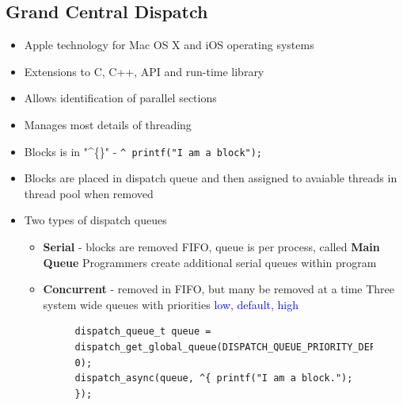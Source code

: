 \documentclass[oneside]{book}
\begin{document}
            \subsection{Grand Central Dispatch}
                \begin{itemize}
                    \item Apple technology for Mac OS X and iOS operating systems
                    \item Extensions to C, C++, API and run-time library
                    \item Allows identification of parallel sections
                    \item Manages most details of threading
                    \item Blocks is in "\textasciicircum\{\}" - \texttt{^{ printf("I am a block"); }}
                    \item Blocks are placed in dispatch queue and then assigned to avaiable threads in thread pool when removed
                    \item Two types of dispatch queues
                        \begin{itemize}
                            \item \textbf{Serial} - blocks are removed FIFO, queue is per process, called \textbf{Main Queue}
                                \subitem Programmers create additional serial queues within program
                            \item \textbf{Concurrent} - removed in FIFO, but many be removed at a time
                                \subitem Three system wide queues with priorities \textcolor{blue}{low, default, high}
                                \begin{figure}[H]
                                    \begin{flushleft}
                                        \begin{verbatim}
dispatch_queue_t queue = dispatch_get_global_queue(DISPATCH_QUEUE_PRIORITY_DEFAULT, 0);
dispatch_async(queue, ^{ printf("I am a block."); });
                                        \end{verbatim}
                                    \end{flushleft}
                                \end{figure}
                        \end{itemize}
                \end{itemize}
\end{document}
